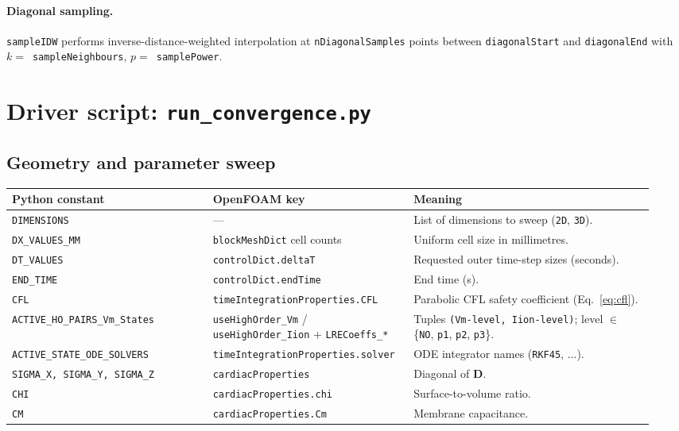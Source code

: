\documentclass[11pt,a4paper]{article}
\newcommand{\Dten}{\mathbf{D}}
\newcommand{\code}[1]{\texttt{\small #1}}
\begin{document}
\paragraph{Diagonal sampling.} \code{sampleIDW} performs
inverse-distance-weighted interpolation at \code{nDiagonalSamples}
points between \code{diagonalStart} and \code{diagonalEnd} with
$k = $~\code{sampleNeighbours}, $p = $~\code{samplePower}.

\section{Driver script: \texttt{run\_convergence.py}}
\label{sec:driver}

\subsection{Geometry and parameter sweep}
\begin{longtable}{@{}p{0.30\linewidth}p{0.28\linewidth}p{0.36\linewidth}@{}}
\toprule
Python constant & OpenFOAM key & Meaning \\
\midrule \endhead
\code{DIMENSIONS} & --- &
   List of dimensions to sweep (\code{2D}, \code{3D}). \\
\code{DX\_VALUES\_MM} & \code{blockMeshDict} cell counts &
   Uniform cell size in millimetres. \\
\code{DT\_VALUES} & \code{controlDict.deltaT} &
   Requested outer time-step sizes (seconds). \\
\code{END\_TIME} & \code{controlDict.endTime} & End time (s). \\
\code{CFL} & \code{timeIntegrationProperties.CFL} &
   Parabolic CFL safety coefficient
   (Eq.~\eqref{eq:cfl}). \\
\code{ACTIVE\_HO\_PAIRS\_Vm\_States} &
   \code{useHighOrder\_Vm} / \code{useHighOrder\_Iion}
   + \code{LRECoeffs\_*} &
   Tuples \texttt{(Vm-level, Iion-level)}; level $\in$
   \{\code{NO}, \code{p1}, \code{p2}, \code{p3}\}. \\
\code{ACTIVE\_STATE\_ODE\_SOLVERS} &
   \code{timeIntegrationProperties.solver} &
   ODE integrator names (\code{RKF45}, $\dots$). \\
\code{SIGMA\_X, SIGMA\_Y, SIGMA\_Z} & \code{cardiacProperties} &
   Diagonal of $\Dten$. \\
\code{CHI} & \code{cardiacProperties.chi} & Surface-to-volume ratio. \\
\code{CM} & \code{cardiacProperties.Cm} & Membrane capacitance. \\
\bottomrule
\end{longtable}
\end{document}
